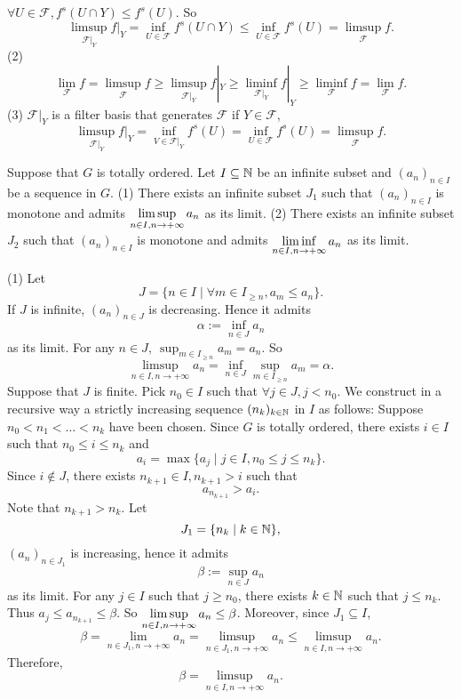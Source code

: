 \begin{proofenv}
    \quad 
    \newline
    $\forall U\in \mathcal{F}, f^s(U\cap Y)\le f^s(U)$. So 
    $$\limsup_{\mathcal{F}|_Y}f|_Y=\inf_{U\in \mathcal{F}}f^s(U\cap Y)\le\inf_{U\in \mathcal{F}}f^s(U)= \limsup_{\mathcal{F}}f.$$
    (2) $$\lim_{\mathcal{F}}f=\limsup_{\mathcal{F}}f\ge\limsup_{\mathcal{F}|_Y}f|_Y\ge \liminf_{\mathcal{F}|_Y}f|_Y\ge \liminf_{\mathcal{F}}f=\lim_{\mathcal{F}}f.$$
    (3) $\mathcal{F}|_Y$ is a filter basis that generates $\mathcal{F}$ if $Y\in \mathcal{F}$,
    $$\limsup_{\mathcal{F}|_Y}f|_Y=\inf_{V\in \mathcal{F}|_Y}f^s(U)=\inf_{U\in \mathcal{F}}f^s(U)=\limsup_{\mathcal{F}}f.$$
\end{proofenv}
\begin{theoremenv}
   Suppose that $G$ is totally ordered. Let $I\subseteq \mathbb{N}$  be an infinite subset and $(a_n)_{n\in I}$ be a sequence in $G$.
   \newline
   (1) There exists an infinite subset $J_1$ such that $(a_n)_{n\in I}$ is monotone and admits $\displaystyle\limsup_{n\in I,n\rightarrow +\infty}a_n$ as its limit.
   \newline
   (2) There exists an infinite subset $J_2$ such that $(a_n)_{n\in I}$ is monotone and admits $\displaystyle\liminf_{n\in I,n\rightarrow +\infty}a_n$ as its limit.
    
\end{theoremenv}
\begin{proofenv}
    \quad\newline
    (1) Let 
    $$J=\{n\in I\mid \forall m\in I_{\ge n},a_m\le a_n\}.$$
    If $J$ is infinite, $(a_n)_{n\in J}$ is decreasing. Hence it admits
    $$\alpha:=\inf_{n\in J}a_n$$
    as its limit. For any $n\in J,\ \sup_{m\in I_{\ge n}}a_m=a_n$. So 
    $$\limsup_{n\in I,n\rightarrow+\infty}a_n=\inf_{n\in J}\sup_{m\in I_{\ge n}}a_m=\alpha.$$
    Suppose that $J$ is finite. Pick $n_0\in I $ such that $\forall j\in J,j<n_0$. We construct  in a recursive way a strictly increasing sequence $(n_k)_{k\in \mathbb{N}}$ in $I$ as follows: Suppose $n_0<n_1<\dots<n_k$ have been chosen. Since $G$ is totally ordered, there exists $i\in I$ such that $n_0\le i\le n_k$ and 
    $$a_i=\max\{a_j\mid j\in I,n_0\le j\le n_k\}.$$
    Since $i\notin J$, there exists $n_{k+1}\in I, n_{k+1}>i$ such that 
    $$a_{n_{k+1}}>a_i.$$
    Note that $n_{k+1}>n_k$. Let 
    $$J_1=\{n_{k}\mid k\in \mathbb{N}\},$$
    $(a_n)_{n\in J_1}$ is increasing, hence it admits 
    $$\beta:=\sup_{n\in J}a_n$$
    as its limit. For any $j\in I$ such that $j\ge n_0$, there exists $k\in \mathbb{N}$ such that $j\le n_k$. Thus $a_j\le a_{n_{k+1}}\le \beta$. So $\displaystyle\limsup_{n\in I,n\rightarrow+\infty}a_n\le \beta$. Moreover, since $J_1\subseteq I$, 
    $$\beta=\lim_{n\in J_1,n\rightarrow+\infty}a_n=\limsup_{n\in J_1,n\rightarrow +\infty}a_n\le\limsup_{n\in I,n\rightarrow +\infty}a_n.$$
    Therefore,
    $$\beta=\limsup_{n\in I,n\rightarrow+\infty}a_n.$$
\end{proofenv}




